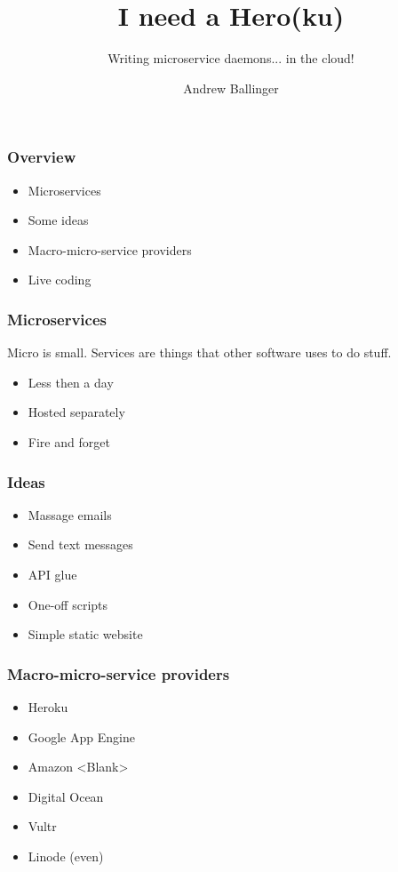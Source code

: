 \documentclass{beamer}
\title{I need a Hero(ku)}
\subtitle{ Writing microservice daemons... in the cloud!}
\author{Andrew Ballinger}
\begin{document}
\frame{\titlepage}

\begin{frame}[fragile]
  \frametitle{Overview}

  \begin{itemize}
  \item{Microservices}
  \item{Some ideas}
  \item{Macro-micro-service providers}
  \item{Live coding}
  \end{itemize}

\end{frame}

\begin{frame}[fragile]
  
  \frametitle{Microservices}
  
  Micro is small. Services are things that other software uses to do stuff.

  \begin{itemize}
  \item{Less then a day}
  \item{Hosted separately}
  \item{Fire and forget}
  \end{itemize}

\end{frame}

\begin{frame}[fragile]
  
  \frametitle{Ideas}

  \begin{itemize}
  \item{Massage emails}
  \item{Send text messages}
  \item{API glue}
  \item{One-off scripts} 
  \item{Simple static website} 
  \end{itemize}

\end{frame}

\begin{frame}[fragile]
  
  \frametitle{Macro-micro-service providers}

  \begin{itemize}
  \item{Heroku}
  \item{Google App Engine}
  \item{Amazon <Blank>}
  \item{Digital Ocean} 
  \item{Vultr} 
  \item{Linode (even)} 
  \end{itemize}

\end{frame}
\end{document}

